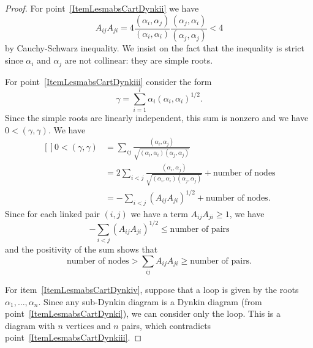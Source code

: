\begin{proof}
	For point~\ref{ItemLesmabsCartDynkii} we have
	\begin{equation}
		A_{ij}A_{ji}=4\frac{ (\alpha_i,\alpha_j) }{ (\alpha_i,\alpha_i) }\frac{ (\alpha_j,\alpha_i) }{ (\alpha_j,\alpha_j) }<4
	\end{equation}
	by Cauchy-Schwarz inequality. We insist on the fact that the inequality is strict since \( \alpha_i\) and \( \alpha_j\) are not collinear: they are simple roots.

	For point~\ref{ItemLesmabsCartDynkiii} consider the form
	\begin{equation}
		\gamma=\sum_{i=1}^l\alpha_i(\alpha_i,\alpha_i)^{1/2}.
	\end{equation}
	Since the simple roots are linearly independent, this sum is nonzero and we have \( 0<(\gamma,\gamma)\). We have
	\begin{equation}
		\begin{aligned}[]
			0<(\gamma,\gamma) & =\sum_{ij}\frac{ (\alpha_i,\alpha_j) }{ \sqrt{(\alpha_i,\alpha_i)(\alpha_j,\alpha_j)} }                           \\
			                  & =2\sum_{i<j} \frac{ (\alpha_i,\alpha_j) }{ \sqrt{(\alpha_i,\alpha_i)(\alpha_j,\alpha_j)} }+\text{number of nodes} \\
			                  & =-\sum_{i<j}(A_{ij}A_{ji})^{1/2}+\text{number of nodes}.
		\end{aligned}
	\end{equation}
	Since for each linked pair \( (i,j)\) we have a term \( A_{ij}A_{ji}\geq 1\), we have
	\begin{equation}
		-\sum_{i<j}(A_{ij}A_{ji})^{1/2}\leq \text{number of pairs}
	\end{equation}
	and the positivity of the sum shows that
	\begin{equation}
		\text{number of nodes}>\sum_{ij}A_{ij}A_{ji}\geq\text{number of pairs}.
	\end{equation}

	For item~\ref{ItemLesmabsCartDynkiv}, suppose that a loop is given by the roots \( \alpha_1,\ldots,\alpha_n\). Since any sub-Dynkin diagram is a Dynkin diagram (from point~\ref{ItemLesmabsCartDynki}), we can consider only the loop. This is a diagram with \( n\) vertices and \( n\) pairs, which contradicts point~\ref{ItemLesmabsCartDynkiii}.


\end{proof}
